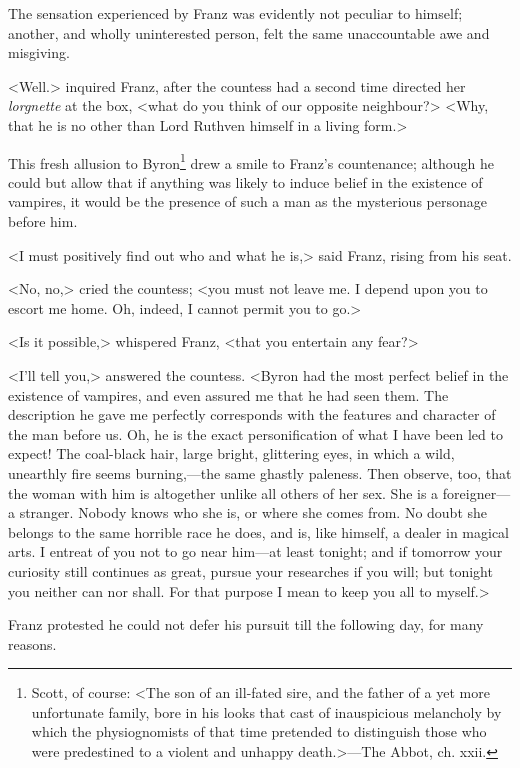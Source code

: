  The sensation experienced by Franz was evidently not peculiar to himself; another, and wholly uninterested person, felt the same unaccountable awe and misgiving. 

 <Well.> inquired Franz, after the countess had a second time directed her \textit{lorgnette} at the box, <what do you think of our opposite neighbour?>  <Why, that he is no other than Lord Ruthven himself in a living form.> 

 This fresh allusion to Byron\footnote{Scott, of course: <The son of an ill-fated sire, and the father of a yet more unfortunate family, bore in his looks that cast of inauspicious melancholy by which the physiognomists of that time pretended to distinguish those who were predestined to a violent and unhappy death.>—The Abbot, ch. xxii.} drew a smile to Franz's countenance; although he could but allow that if anything was likely to induce belief in the existence of vampires, it would be the presence of such a man as the mysterious personage before him. 

 <I must positively find out who and what he is,> said Franz, rising from his seat. 

 <No, no,> cried the countess; <you must not leave me. I depend upon you to escort me home. Oh, indeed, I cannot permit you to go.> 

 <Is it possible,> whispered Franz, <that you entertain any fear?> 

 <I'll tell you,> answered the countess. <Byron had the most perfect belief in the existence of vampires, and even assured me that he had seen them. The description he gave me perfectly corresponds with the features and character of the man before us. Oh, he is the exact personification of what I have been led to expect! The coal-black hair, large bright, glittering eyes, in which a wild, unearthly fire seems burning,—the same ghastly paleness. Then observe, too, that the woman with him is altogether unlike all others of her sex. She is a foreigner—a stranger. Nobody knows who she is, or where she comes from. No doubt she belongs to the same horrible race he does, and is, like himself, a dealer in magical arts. I entreat of you not to go near him—at least tonight; and if tomorrow your curiosity still continues as great, pursue your researches if you will; but tonight you neither can nor shall. For that purpose I mean to keep you all to myself.> 

 Franz protested he could not defer his pursuit till the following day, for many reasons. 

